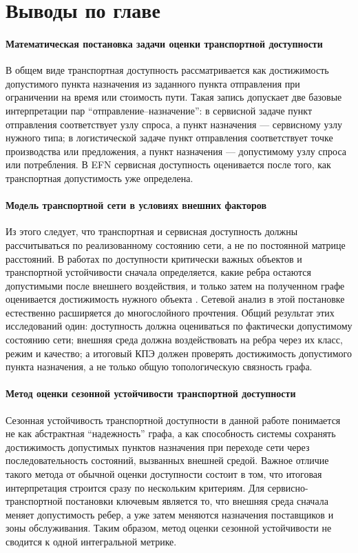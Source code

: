 \section{Выводы по главе}
\label{sec:chapter2-conclusions}

\paragraph*{Математическая постановка задачи оценки транспортной доступности}
В общем виде транспортная доступность рассматривается как достижимость допустимого пункта назначения из заданного пункта отправления при ограничении на время или стоимость пути. Такая запись допускает две базовые интерпретации пар ``отправление--назначение'': в сервисной задаче пункт отправления соответствует узлу спроса, а пункт назначения --- сервисному узлу нужного типа; в логистической задаче пункт отправления соответствует точке производства или предложения, а пункт назначения --- допустимому узлу спроса или потребления. В EFN сервисная доступность оценивается после того, как транспортная допустимость уже определена.

\paragraph*{Модель транспортной сети в условиях внешних факторов}
Из этого следует, что транспортная и сервисная доступность должны рассчитываться по реализованному состоянию сети, а не по постоянной матрице расстояний. В работах по доступности критически важных объектов и транспортной устойчивости сначала определяется, какие ребра остаются допустимыми после внешнего воздействия, и только затем на полученном графе оценивается достижимость нужного объекта \cite{gangwal2023criticalFacility,yin2023transportResilience}. Сетевой анализ в этой постановке естественно расширяется до многослойного прочтения. Общий результат этих исследований один: доступность должна оцениваться по фактически допустимому состоянию сети; внешняя среда должна воздействовать на ребра через их класс, режим и качество; а итоговый КПЭ должен проверять достижимость допустимого пункта назначения, а не только общую топологическую связность графа.

\paragraph*{Метод оценки сезонной устойчивости транспортной доступности}
Сезонная устойчивость транспортной доступности в данной работе понимается не как абстрактная ``надежность'' графа, а как способность системы сохранять достижимость допустимых пунктов назначения при переходе сети через последовательность состояний, вызванных внешней средой. Важное отличие такого метода от обычной оценки доступности состоит в том, что итоговая интерпретация строится сразу по нескольким критериям. Для сервисно-транспортной постановки ключевым является то, что внешняя среда сначала меняет допустимость ребер, а уже затем меняются назначения поставщиков и зоны обслуживания. Таким образом, метод оценки сезонной устойчивости не сводится к одной интегральной метрике.
